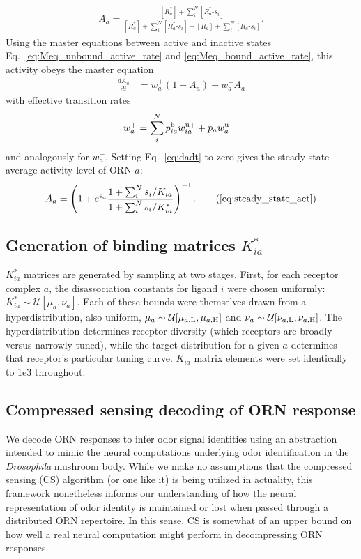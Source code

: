\begin{align}
A_a = \frac{[R^*_a] + \sum_i^N[R^*_a\text{-}s_i]}{[R^*_a] + \sum_i^N[R^*_a\text{-}s_i] + {[R_a] + \sum_i^N[R_a\text{-}s_i]}}.
\end{align} 
Using the master equations between active and inactive states Eq.~\ref{eq:Meq_unbound_active_rate} and \ref{eq:Meq_bound_active_rate}, this activity obeys the master equation
\begin{align}
\frac{dA_a}{dt} &= w^+_a(1 - A_a) + w^-_aA_a
\label{eq:dadt}
\end{align}
with effective transition rates
\begin{align}
w^+_a &= \sum_i^Np^{\text b}_{ia} w^{\text u +}_{ia} + p_{a}w^{\text u}_a 
\end{align}
and analogously for $w_a^-$. Setting Eq.~\ref{eq:dadt} to zero gives the steady state average activity level of ORN $a$:
\begin{align}
A_a = \left(1 + e^{\epsilon_a}\frac{1 + \sum_i^N s_i/K_{ia}}{1 + \sum_i^N s_i/K^*_{ia}}\right)^{-1}. \tag{\ref{eq:steady_state_act}}
\end{align}
	
\subsection{Generation of binding matrices $K^*_{ia}$}
$K_{ia}^*$ matrices are generated by sampling at two stages. First, for each receptor complex $a$, the disassociation constants for ligand $i$ were chosen uniformly: $K^*_{ia} \sim \mathcal U[\mu_a, \nu_a]$. Each of these bounds were themselves drawn from a hyperdistribution, also uniform, $\mu_a \sim \mathcal U[\mu_{a, \text L}, \mu_{a, \text H}]$ and $\nu_a \sim \mathcal U[\nu_{a, \text L}, \nu_{a, \text H}]$. The hyperdistribution determines receptor diversity (which receptors are broadly versus narrowly tuned), while the target distribution for a given $a$ determines that receptor's particular tuning curve. $K_{ia}$ matrix elements were set identically to 1e3 throughout. 


\subsection{Compressed sensing decoding of ORN response}
We decode ORN responses to infer odor signal identities using an abstraction intended to mimic the neural computations underlying odor identification in the \textit{Drosophila} mushroom body. While we make no assumptions that the compressed sensing (CS) algorithm (or one like it) is being utilized in actuality, this framework nonetheless informs our understanding of how the neural representation of odor identity is maintained or lost when passed through a distributed ORN repertoire. In this sense, CS is somewhat of an upper bound on how well a real neural computation might perform in decompressing ORN responses.

